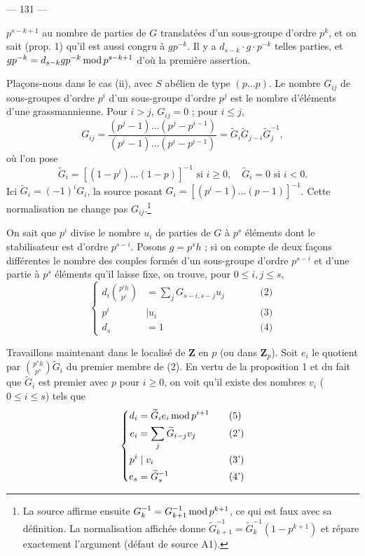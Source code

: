 \documentclass[12pt,reqno]{amsart}
\newcommand{\sourcepage}[1]{%
  \clearpage
  \begin{center}
    --- #1 ---
  \end{center}
  \vspace{0.6em}
}
\begin{document}
\sourcepage{131}

\noindent $p^{s-k+1}$ au nombre de parties de $G$ translatées d'un sous-groupe d'ordre $p^k$, et on sait (prop. 1) qu'il est aussi congru à $gp^{-k}$. Il y a $d_{s-k}\mathbin{\cdot}g\mathbin{\cdot}p^{-k}$ telles parties, et $gp^{-k}=d_{s-k}gp^{-k}\mathop{\rm mod}p^{s-k+1}$ d'où la première assertion.

Plaçons-nous dans le cas (ii), avec $S$ abélien de type $(p\ldots p)$. Le nombre $G_{ij}$ de sous-groupes d'ordre $p^i$ d'un sous-groupe d'ordre $p^j$ est le nombre d'éléments d'une grassmannienne. Pour $i>j$, $G_{ij}=0$ ; pour $i\leq j$,
\[
G_{ij}=\frac{(p^j-1)\ldots(p^j-p^{i-1})}{(p^i-1)\ldots(p^i-p^{i-1})}
=\widetilde G_i\widetilde G_{j-i}\widetilde G_j^{-1},
\]
où l'on pose
\[
\widetilde G_i=[(1-p^i)\ldots(1-p)]^{-1}\text{ si }i\geq0,
\quad \widetilde G_i=0\text{ si }i<0.
\]
Ici $\widetilde G_i=(-1)^iG_i$, la source posant
$G_i=[(p^i-1)\ldots(p-1)]^{-1}$. Cette normalisation ne change pas
$G_{ij}$.\footnote{La source affirme ensuite
$G_k^{-1}=G_{k+1}^{-1}\mathop{\rm mod}p^{k+1}$, ce qui est faux avec
sa définition. La normalisation affichée donne
$\widetilde G_{k+1}^{-1}=\widetilde G_k^{-1}(1-p^{k+1})$ et répare
exactement l'argument (défaut de source A1).}

On sait que $p^i$ divise le nombre $u_i$ de parties de $G$ à $p^s$ éléments dont le stabilisateur est d'ordre $p^{s-i}$. Posons $g=p^s h$ ; si on compte de deux façons différentes le nombre des couples formés d'un sous-groupe d'ordre $p^{s-i}$ et d'une partie à $p^s$ éléments qu'il laisse fixe, on trouve, pour $0\leq i,j\leq s$,
\[
\left\{
\begin{alignedat}{2}
d_i\binom{p^i h}{p^i}&=\sum_jG_{s-i,s-j}u_j &\qquad& \text{(2)}\\
p^i&\mid u_i && \text{(3)}\\
d_s&=1 && \text{(4)}
\end{alignedat}
\right.
\]

Travaillons maintenant dans le localisé de $\mathbf Z$ en $p$ (ou dans $\mathbf Z_p$). Soit $e_i$ le quotient par $\binom{p^s h}{p^s}\widetilde G_i$ du premier membre de (2). En vertu de la proposition 1 et du fait que $\widetilde G_i$ est premier avec $p$ pour $i\geq0$, on voit qu'il existe des nombres $v_i$ ($0\leq i\leq s$) tels que
\[
\left\{
\begin{alignedat}{2}
d_i&=\widetilde G_ie_i\mathop{\rm mod}p^{i+1} &\qquad& \text{(5)}\\
e_i&=\sum_j\widetilde G_{i-j}v_j && \text{(2')}\\
p^i&\mid v_i && \text{(3')}\\
e_s&=\widetilde G_s^{-1} && \text{(4')}
\end{alignedat}
\right.
\]
\end{document}
